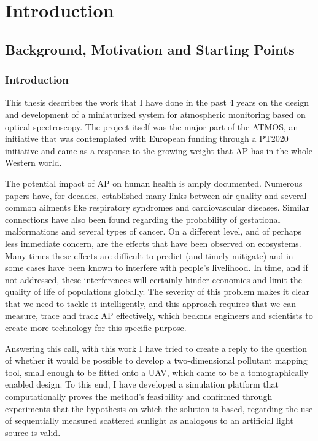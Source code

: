 \chapter{Introduction}%
\label{cha:introduction}

\section{Background, Motivation and Starting Points}%
\label{sec:background_and_motivation}

\subsection{Introduction}%
\label{sub:introduction}

This thesis describes the work that I have done in the past 4 years on
the design and development of a miniaturized system for atmospheric
monitoring based on optical spectroscopy. The project itself was the
major part of the \gls{ATMOS}, an initiative that was
contemplated with European funding through a \gls{PT2020} initiative and
came as a response to the growing weight that \gls{AP} has in the whole
Western world.

The potential impact of \gls{AP} on human health is amply documented.
Numerous papers have, for decades, established many links between air
quality and several common ailments like respiratory syndromes and
cardiovascular diseases. Similar connections have also been found
regarding the probability of gestational malformations and several types
of cancer. On a different level, and of perhaps less immediate concern,
are the effects that have been observed on ecosystems. Many times these
effects are difficult to predict (and timely mitigate) and in some cases
have been known to interfere with people's livelihood. In time, and if
not addressed, these interferences will certainly hinder economies and
limit the quality of life of populations globally. The severity of this
problem makes it clear that we need to tackle it intelligently, and this
approach requires that we can measure, trace and track \gls{AP}
effectively, which beckons engineers and scientists to create more
technology for this specific purpose.

Answering this call, with this work I have tried to create a reply to
the question of whether it would be possible to develop a
two-dimensional pollutant mapping tool, small enough to be fitted onto a
\gls{UAV}, which came to be a tomographically enabled design. To this
end, I have developed a simulation platform that computationally proves
the method's feasibility and confirmed through experiments that the
hypothesis on which the solution is based, regarding the use of
sequentially measured scattered sunlight as analogous to an artificial
light source is valid.

